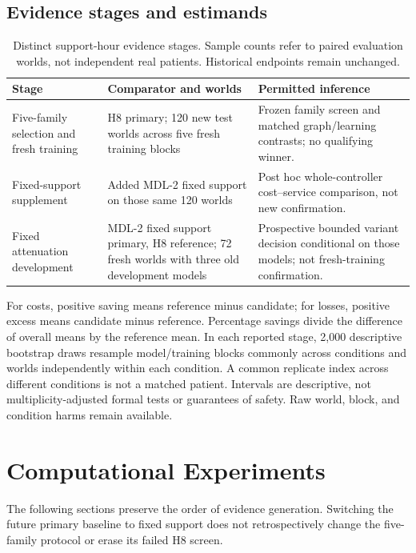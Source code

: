 \documentclass[preprint,review,12pt]{elsarticle}
\begin{document}
\subsection{Evidence stages and estimands}
\begin{table}[tbp]
\centering
\caption{Distinct support-hour evidence stages. Sample counts refer to paired
evaluation worlds, not independent real patients. Historical endpoints remain unchanged.}
\label{tab:evidence-stages}
\small
\begin{tabularx}{\textwidth}{p{}p{}X}
\toprule
Stage & Comparator and worlds & Permitted inference \\
\midrule
Five-family selection and fresh training & H8 primary; 120 new test worlds
across five fresh training blocks & Frozen family screen and matched graph/learning
contrasts; no qualifying winner. \\
Fixed-support supplement & Added MDL-2 fixed support on those same 120 worlds &
Post hoc whole-controller cost--service comparison, not new confirmation. \\
Fixed attenuation development & MDL-2 fixed support primary, H8 reference;
72 fresh worlds with three old development models & Prospective bounded
variant decision conditional on those models; not fresh-training confirmation. \\
\bottomrule
\end{tabularx}
\end{table}

For costs, positive saving means reference minus candidate; for losses,
positive excess means candidate minus reference. Percentage savings divide
the difference of overall means by the reference mean. In each reported
stage, 2,000 descriptive bootstrap draws resample model/training blocks
commonly across conditions and worlds independently within each condition.
A common replicate index across different conditions is not a matched patient.
Intervals are descriptive, not multiplicity-adjusted formal tests or
guarantees of safety. Raw world, block, and condition harms remain available.

\section{Computational Experiments}
\label{sec:experiments}
The following sections preserve the order of evidence generation. Switching
the future primary baseline to fixed support does not retrospectively
change the five-family protocol or erase its failed H8 screen.
\end{document}
